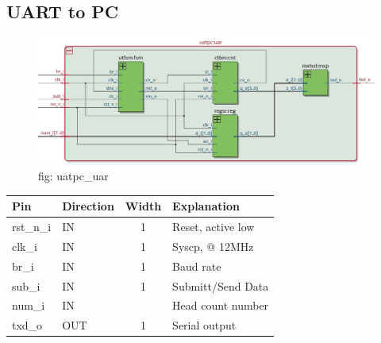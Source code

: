 \documentclass[12pt,a4 paper] {report}
\begin{document}
\subsection{UART to PC}
\begin{figure}[h]
	\centering	
	\includegraphics[scale=0.3]{../png/uatpc_uar.png}
	\newline
	fig: uatpc\_uar\\
\end{figure}
\begin{center}
	\begin{tabular}{| p{2cm} | p{2cm} | c| p{4cm} |}
		\hline
		Pin & Direction & Width & Explanation\\
		\hline	
  		rst\_n\_i & IN & 1 & Reset, active low\\
  		\hline
		clk\_i & IN & 1 &  Syscp, @ 12MHz \\
		\hline
		br\_i    & IN & 1 &      Baud rate \\
		\hline
		sub\_i   & IN & 1 &        Submitt/Send Data\\
		\hline
		num\_i   & IN  & &		Head count number\\
		\hline
		txd\_o   & OUT & 1 &       Serial output \\
		\hline
	\end{tabular}
\end{center}
\newpage
\end{document}
